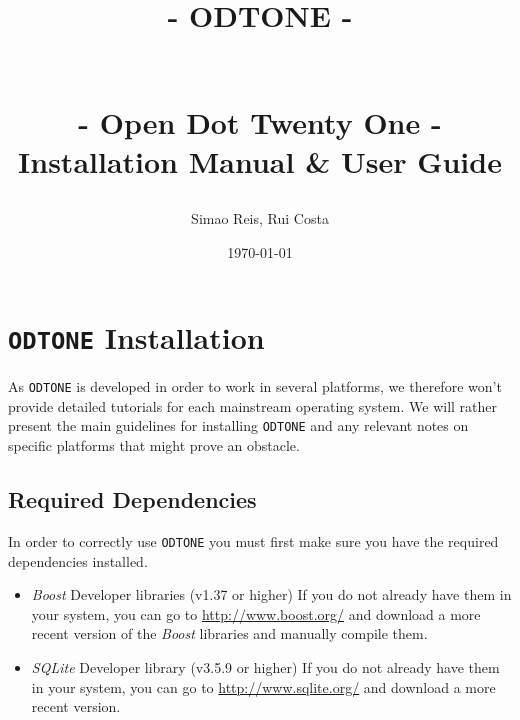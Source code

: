 \documentclass[11pt]{article}
\title{ \begin{Huge} \textbf{- ODTONE -} \end{Huge} \\ \vspace*{1cm}
- \textbf{O}pen \textbf{D}ot \textbf{T}wenty \textbf{One} - \\ \vspace*{3cm}
Installation Manual \& User Guide \vspace*{3cm}}
\author{Simao Reis,
Rui Costa
\vspace*{0.5cm}}
\date{\today}
\begin{document}
\maketitle
\newpage

\setcounter{tocdepth}{3}
\tableofcontents
\vspace*{1cm}
\newpage

\section{\texttt{ODTONE} Installation}
\label{sec-1}

As \texttt{ODTONE} is developed in order to work in several platforms, we therefore
won't provide detailed tutorials for each mainstream operating system. We will rather
present the main guidelines for installing \texttt{ODTONE} and any relevant notes on
specific platforms that might prove an obstacle.

\subsection{Required Dependencies}
\label{sec-1.1}

In order to correctly use \texttt{ODTONE} you must first make sure you have the
required dependencies installed.

\begin{itemize}
\item \textit{Boost} Developer libraries (v1.37 or higher)
	\subitem	If you do not already have them in your system, you can go to
			\url{http://www.boost.org/} and download a more recent version
			of the \textit{Boost} libraries and manually compile them.

%


\item \textit{SQLite} Developer library (v3.5.9 or higher)
	\subitem	If you do not already have them in your system, you can go to
			\url{http://www.sqlite.org/} and download a more recent version.


%


\end{itemize}
\end{document}
